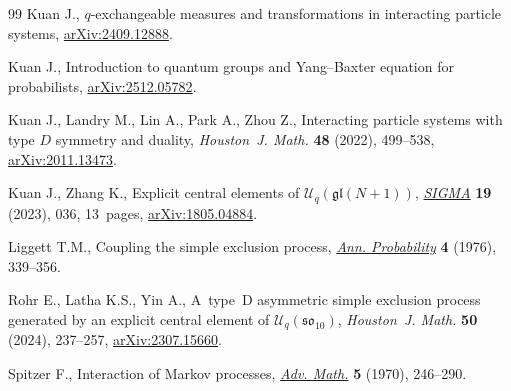 \begin{thebibliography}{99}
Kuan J., $q$-exchangeable measures and transformations in interacting particle
 systems, \href{https://arxiv.org/abs/2409.12888}{arXiv:2409.12888}.

Kuan J., Introduction to quantum groups and Yang--Baxter equation for
 probabilists, \href{https://arxiv.org/abs/2512.05782}{arXiv:2512.05782}.

Kuan J., Landry M., Lin A., Park A., Zhou Z., Interacting particle systems with
 type {$D$} symmetry and duality, \textit{Houston~J. Math.} \textbf{48}
 (2022), 499--538, \href{https://arxiv.org/abs/2011.13473}{arXiv:2011.13473}.

Kuan J., Zhang K., Explicit central elements of
 {$\mathcal{U}_q(\mathfrak{gl}(N+1))$},
 \href{https://doi.org/10.3842/SIGMA.2023.036}{\textit{SIGMA}} \textbf{19}
 (2023), 036, 13~pages,
 \href{https://arxiv.org/abs/1805.04884}{arXiv:1805.04884}.

Liggett T.M., Coupling the simple exclusion process,
 \href{https://doi.org/10.1214/aop/1176996084}{\textit{Ann. Probability}}
 \textbf{4} (1976), 339--356.

Rohr E., Latha K.S., Yin A., A~type~{D} asymmetric simple exclusion process
 generated by an explicit central element of {$\mathcal
 U_q(\mathfrak{so}_{10})$}, \textit{Houston~J. Math.} \textbf{50} (2024),
 237--257, \href{https://arxiv.org/abs/2307.15660}{arXiv:2307.15660}.

Spitzer F., Interaction of {M}arkov processes,
 \href{https://doi.org/10.1016/0001-8708(70)90034-4}{\textit{Adv. Math.}}
 \textbf{5} (1970), 246--290.

\end{thebibliography}
